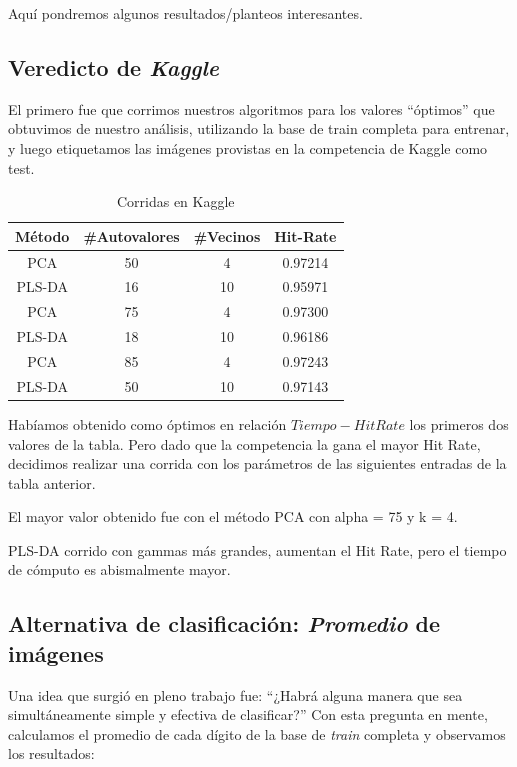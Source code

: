 Aqu\'i pondremos algunos resultados/planteos interesantes.

\subsection{Veredicto de \textit{Kaggle}}

El primero fue que corrimos nuestros algoritmos para los valores ``\'optimos'' que obtuvimos de nuestro an\'alisis, utilizando la base de train completa para entrenar, y luego etiquetamos las im\'agenes provistas en la competencia de Kaggle como test.

\begin{table}[h!]
\begin{center}
\begin{tabular}{|c|c|c|c|}
	\hline
	M\'etodo & \#Autovalores & \#Vecinos & Hit-Rate \\
	\hline
	PCA & 50 & 4 & 0.97214 \\
	\hline
	PLS-DA & 16 & 10 & 0.95971 \\
	\hline
	PCA & 75 & 4 & 0.97300 \\
	\hline
	PLS-DA & 18 & 10 & 0.96186 \\
	\hline
	PCA & 85 & 4 & 0.97243 \\
	\hline
	PLS-DA & 50 & 10 & 0.97143 \\
	\hline
\end{tabular}
\end{center}
\caption{Corridas en Kaggle}
\end{table}

Hab\'iamos obtenido como \'optimos en relaci\'on $Tiempo-Hit Rate$ los primeros dos valores de la tabla. Pero dado que la competencia la gana el mayor Hit Rate, decidimos realizar una corrida con los par\'ametros de las siguientes entradas de la tabla anterior.

El mayor valor obtenido fue con el m\'etodo PCA con alpha = 75 y k = 4.

PLS-DA corrido con gammas m\'as grandes, aumentan el Hit Rate, pero el tiempo de c\'omputo es abismalmente mayor.

\subsection{Alternativa de clasificaci\'on: \textit{Promedio} de im\'agenes}

Una idea que surgi\'o en pleno trabajo fue: ``¿Habr\'a alguna manera que sea simult\'aneamente simple y efectiva de clasificar?'' Con esta pregunta en mente, calculamos el promedio de cada d\'igito de la base de \textit{train} completa y observamos los resultados: \\

